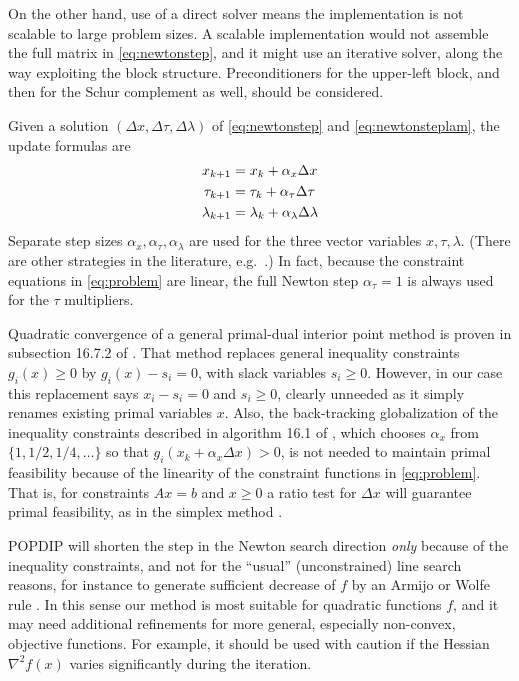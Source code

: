 \documentclass[11pt]{article}
\newcommand{\grad}{\nabla}
\begin{document}
On the other hand, use of a direct solver means the implementation is not scalable to large problem sizes.  A scalable implementation would not assemble the full matrix in \eqref{eq:newtonstep}, and it might use an iterative solver, along the way exploiting the block structure.  Preconditioners \cite{Bueler2021,TrefethenBau1997} for the upper-left block, and then for the Schur complement \cite[chapter 14]{Bueler2021} as well, should be considered.

Given a solution $(\Delta x,\Delta\tau,\Delta\lambda)$ of \eqref{eq:newtonstep} and \eqref{eq:newtonsteplam}, the update formulas are
\begin{align}
x_{k+1} &= x_k + \alpha_x \Delta x \label{eq:updates} \\
\tau_{k+1} &= \tau_k + \alpha_\tau \Delta \tau \notag \\
\lambda_{k+1} &= \lambda_k + \alpha_\lambda \Delta \lambda \notag
\end{align}
Separate step sizes $\alpha_x,\alpha_\tau,\alpha_\lambda$ are used for the three vector variables $x,\tau,\lambda$.  (There are other strategies in the literature, e.g.~\cite{YamashitaYabe1996}.)  In fact, because the constraint equations in \eqref{eq:problem} are linear, the full Newton step $\alpha_\tau=1$ is always used for the $\tau$ multipliers.

Quadratic convergence of a general primal-dual interior point method is proven in subsection 16.7.2 of \cite{GrivaNashSofer2009}.  That method replaces general inequality constraints $g_i(x)\ge 0$ by $g_i(x) - s_i =0$, with slack variables $s_i\ge 0$.  However, in our case this replacement says $x_i-s_i=0$ and $s_i\ge 0$, clearly unneeded as it simply renames existing primal variables $x$.  Also, the back-tracking globalization of the inequality constraints described in algorithm 16.1 of \cite{GrivaNashSofer2009}, which chooses $\alpha_x$ from $\{1,1/2,1/4,\dots\}$ so that $g_i(x_k + \alpha_x \Delta x) > 0$, is not needed to maintain primal feasibility because of the linearity of the constraint functions in \eqref{eq:problem}.  That is, for constraints $Ax=b$ and $x\ge 0$ a ratio test for $\Delta x$ will guarantee primal feasibility, as in the simplex method \cite[chapter 5]{GrivaNashSofer2009}.

POPDIP will shorten the step in the Newton search direction \emph{only} because of the inequality constraints, and not for the ``usual'' (unconstrained) line search reasons, for instance to generate sufficient decrease of $f$ by an Armijo or Wolfe rule \cite[section 11.5]{GrivaNashSofer2009}.  In this sense our method is most suitable for quadratic functions $f$, and it may need additional refinements for more general, especially non-convex, objective functions.  For example, it should be used with caution if the Hessian $\grad^2 f(x)$ varies significantly during the iteration.
\end{document}
